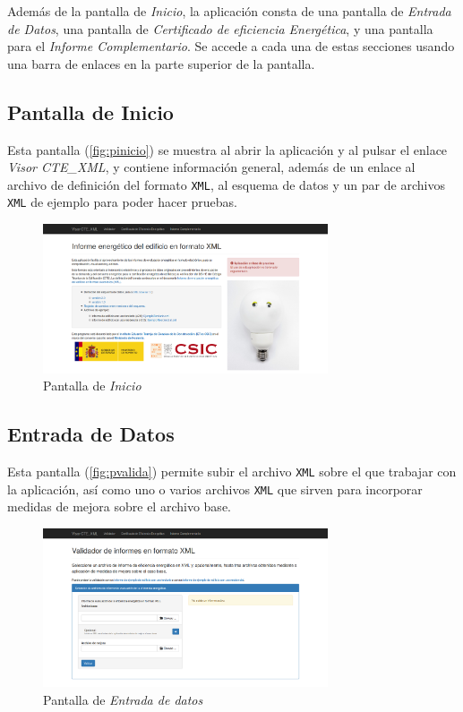 \documentclass[10pt,notitlepage,oneside,a4paper]{article}
\begin{document}
Además de la pantalla de \textit{Inicio}, la aplicación consta de una pantalla de \textit{Entrada de Datos}, una pantalla de \textit{Certificado de eficiencia Energética}, y una pantalla para el \textit{Informe Complementario}. Se accede a cada una de estas secciones usando una barra de enlaces en la parte superior de la pantalla.

\subsection{Pantalla de Inicio}

Esta pantalla (\autoref{fig:pinicio}) se muestra al abrir la aplicación y al pulsar el enlace \textit{Visor CTE\_XML}, y contiene información general, además de un enlace al archivo de definición del formato \texttt{XML}, al esquema de datos y un par de archivos \texttt{XML} de ejemplo para poder hacer pruebas.

\begin{figure}[H]
  \centering
  \includegraphics[width=0.75\textwidth]{imagenes/pantalla_inicio}  
  \caption{Pantalla de \textit{Inicio}}
  \label{fig:pinicio}
\end{figure}

\subsection{Entrada de Datos}

Esta pantalla (\autoref{fig:pvalida}) permite subir el archivo \texttt{XML} sobre el que trabajar con la aplicación, así como uno o varios archivos \texttt{XML} que sirven para incorporar medidas de mejora sobre el archivo base.

\begin{figure}[H]
  \centering
  \includegraphics[width=0.75\textwidth]{imagenes/pantalla_entradadatos}  
  \caption{Pantalla de \textit{Entrada de datos}}
  \label{fig:pvalida}
\end{figure}
\end{document}
